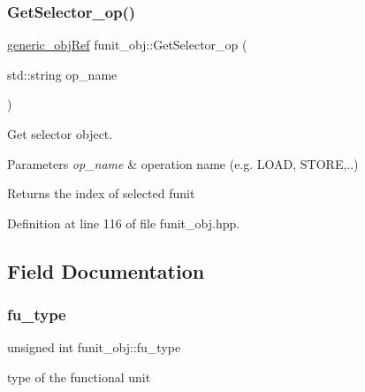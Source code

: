 \mbox{\label{classfunit__obj_ab683e0c5ccc08ec37d77ea1f1c1ba6f3}} 
\subsubsection{\texorpdfstring{Get\+Selector\+\_\+op()}{GetSelector\_op()}}
{\footnotesize\ttfamily \hyperlink{generic__obj_8hpp_acb533b2ef8e0fe72e09a04d20904ca81}{generic\+\_\+obj\+Ref} funit\+\_\+obj\+::\+Get\+Selector\+\_\+op (\begin{DoxyParamCaption}\item[{std\+::string}]{op\+\_\+name }\end{DoxyParamCaption})\hspace{0.3cm}{\ttfamily [inline]}}



Get selector object. 


\begin{DoxyParams}{Parameters}
{\em op\+\_\+name} & operation name (e.\+g. L\+O\+AD, S\+T\+O\+RE,..) \\
\hline
\end{DoxyParams}
\begin{DoxyReturn}{Returns}
the index of selected funit 
\end{DoxyReturn}


Definition at line 116 of file funit\+\_\+obj.\+hpp.



\subsection{Field Documentation}
\mbox{\label{classfunit__obj_a107db9aec0bbc47ee439130c0841b986}} 
\subsubsection{\texorpdfstring{fu\+\_\+type}{fu\_type}}
{\footnotesize\ttfamily unsigned int funit\+\_\+obj\+::fu\+\_\+type\hspace{0.3cm}{\ttfamily [private]}}



type of the functional unit 



